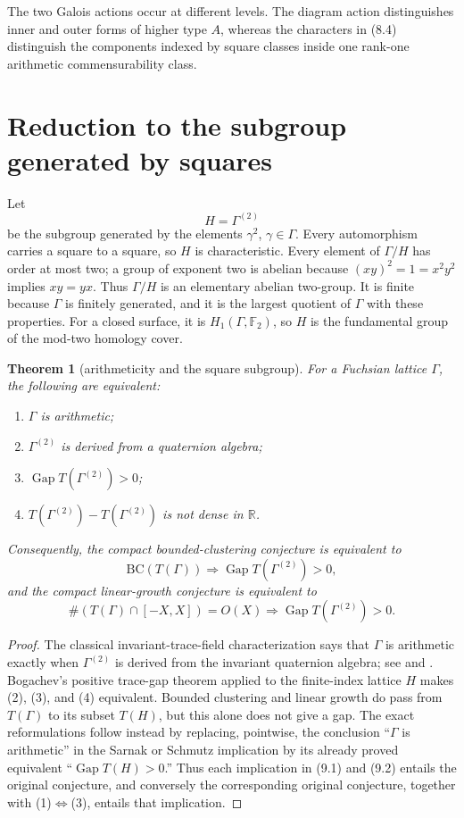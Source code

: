 \documentclass[11pt,reqno]{amsart}
\newtheorem{theorem}{Theorem}[section]
\theoremstyle{definition}
\theoremstyle{remark}
\newcommand{\R}{\mathbb R}
\newcommand{\F}{\mathbb F}
\newcommand{\Gap}{\operatorname{Gap}}
\newcommand{\BC}{\mathrm{BC}}
\begin{document}
The two Galois actions occur at different levels.  The diagram action
distinguishes inner and outer forms of higher type \(A\), whereas the
characters in (8.4) distinguish the components indexed by square classes
inside one rank-one arithmetic commensurability class.

\section{Reduction to the subgroup generated by squares}

Let
\[
 H=\Gamma^{(2)}
\]
be the subgroup generated by the elements \(\gamma^2\),
\(\gamma\in\Gamma\).  Every automorphism carries a square to a square, so
\(H\) is characteristic.  Every element of \(\Gamma/H\) has order at most
two; a group of exponent two is abelian because
\((xy)^2=1=x^2y^2\) implies \(xy=yx\).  Thus \(\Gamma/H\) is an elementary
abelian two-group.  It is finite because \(\Gamma\) is finitely generated,
and it is the largest quotient of \(\Gamma\) with these properties.  For a
closed surface, it is \(H_1(\Gamma,\F_2)\), so \(H\) is the fundamental
group of the mod-two homology cover.

\begin{theorem}[arithmeticity and the square subgroup]\label{thm:kummer-reduction}
For a Fuchsian lattice \(\Gamma\), the following are equivalent:
\begin{enumerate}[label=\textup{(\arabic*)}]
\item \(\Gamma\) is arithmetic;
\item \(\Gamma^{(2)}\) is derived from a quaternion algebra;
\item \(\Gap T(\Gamma^{(2)})>0\);
\item \(T(\Gamma^{(2)})-T(\Gamma^{(2)})\) is not dense in \(\R\).
\end{enumerate}
Consequently, the compact bounded-clustering conjecture is equivalent to
\[
 \BC(T(\Gamma))\Longrightarrow \Gap T(\Gamma^{(2)})>0,
\tag{9.1}
\]
and the compact linear-growth conjecture is equivalent to
\[
 \#(T(\Gamma)\cap[-X,X])=O(X)
 \Longrightarrow \Gap T(\Gamma^{(2)})>0.
\tag{9.2}
\]
\end{theorem}

\begin{proof}
The classical invariant-trace-field characterization says that \(\Gamma\) is
arithmetic exactly when \(\Gamma^{(2)}\) is derived from the invariant
quaternion algebra; see \cite{Takeuchi} and
\cite[Chapter~8]{MaclachlanReid}.  Bogachev's positive trace-gap theorem applied to the
finite-index lattice \(H\) makes (2), (3), and (4) equivalent.  Bounded
clustering and linear growth do pass from \(T(\Gamma)\) to its subset
\(T(H)\), but this alone does not give a gap.  The exact reformulations follow
instead by replacing, pointwise, the conclusion ``\(\Gamma\) is arithmetic''
in the Sarnak or Schmutz implication by its already proved equivalent
``\(\Gap T(H)>0\).''  Thus each implication in (9.1) and (9.2) entails the
original conjecture, and conversely the corresponding original conjecture,
together with (1)\(\Leftrightarrow\)(3), entails that implication.
\end{proof}
\end{document}
